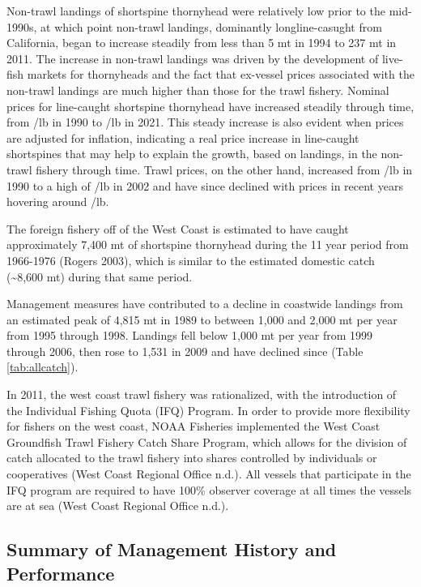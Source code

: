 \documentclass[11pt,
  english,
  letterpaper,
]{article}
\begin{document}
Non-trawl landings of shortspine thornyhead were relatively low prior to the mid-1990s, at which point non-trawl landings, dominantly longline-casught from California, began to increase steadily from less than 5 mt in 1994 to 237 mt in 2011. The increase in non-trawl landings was driven by the development of live-fish markets for thornyheads and the fact that ex-vessel prices associated with the non-trawl landings are much higher than those for the trawl fishery. Nominal prices for line-caught shortspine thornyhead have increased steadily through time, from /lb in 1990 to /lb in 2021. This steady increase is also evident when prices are adjusted for inflation, indicating a real price increase in line-caught shortspines that may help to explain the growth, based on landings, in the non-trawl fishery through time. Trawl prices, on the other hand, increased from /lb in 1990 to a high of /lb in 2002 and have since declined with prices in recent years hovering around /lb.

The foreign fishery off of the West Coast is estimated to have caught approximately 7,400 mt of shortspine thornyhead during the 11 year period from 1966-1976 (Rogers 2003), which is similar to the estimated domestic catch (\textasciitilde8,600 mt) during that same period.

Management measures have contributed to a decline in coastwide landings from an estimated peak of 4,815 mt in 1989 to between 1,000 and 2,000 mt per year from 1995 through 1998. Landings fell below 1,000 mt per year from 1999 through 2006, then rose to 1,531 in 2009 and have declined since (Table \ref{tab:allcatch}).

In 2011, the west coast trawl fishery was rationalized, with the introduction of the Individual Fishing Quota (IFQ) Program. In order to provide more flexibility for fishers on the west coast, NOAA Fisheries implemented the West Coast Groundfish Trawl Fishery Catch Share Program, which allows for the division of catch allocated to the trawl fishery into shares controlled by individuals or cooperatives (West Coast Regional Office n.d.). All vessels that participate in the IFQ program are required to have 100\% observer coverage at all times the vessels are at sea (West Coast Regional Office n.d.).

\hypertarget{summary-of-management-history-and-performance}{%
\subsection{Summary of Management History and Performance}\label{summary-of-management-history-and-performance}}
\end{document}
